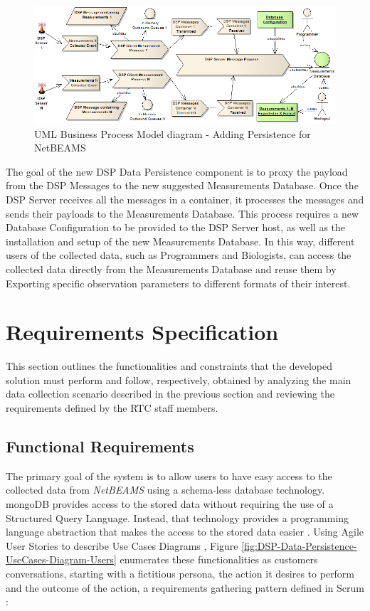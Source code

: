 \begin{figure}[!b]
  \centering
  \includegraphics[scale=0.6]{../diagrams/DSP-DataPersistence-Business-Diagram}
  \caption{UML Business Process Model diagram - Adding Persistence for NetBEAMS}
  \label{fig:dsp-persistence-business-process}
\end{figure}

The goal of the new DSP Data Persistence component is to proxy the payload 
from the DSP Messages to the new suggested Measurements Database. Once the DSP
Server receives all the messages in a container, it processes the messages and
sends their payloads to the Measurements Database. This process requires a new
Database Configuration to be provided to the DSP Server host, as well as the
installation and setup of the new Measurements Database. In this way, different
users of the collected data, such as Programmers and Biologists, can access the
collected data directly from the Measurements Database and reuse them by
Exporting specific observation parameters to different formats of their
interest.

\section{Requirements Specification}

This section outlines the functionalities and constraints that the developed
solution must perform and follow, respectively, obtained by analyzing the main
data collection scenario described in the previous section and reviewing the
requirements defined by the RTC staff members.

\subsection{Functional Requirements}
\label{sec:use-cases}

The primary goal of the system is to allow users to have easy access to the 
collected data from \emph{NetBEAMS} using a schema-less database technology.
mongoDB provides access to the stored data without requiring the use of 
a Structured Query Language. Instead, that technology provides a programming
language abstraction that makes the access to the stored data easier 
\cite{sn-programming-language}. Using Agile User Stories to describe Use 
Cases Diagrams \cite{use-cases-user-stories}, Figure 
\ref{fig:DSP-Data-Persistence-UseCases-Diagram-Users} enumerates these
functionalities as customers conversations, starting with a fictitious
persona, the action it desires to perform and the outcome of the action, a
requirements gathering pattern defined in Scrum \cite{agile-scrum}:

